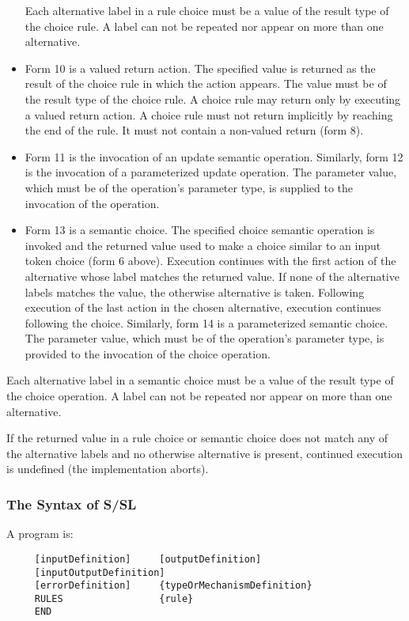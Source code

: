 \begin{itemize}
Each     alternative  label in a rule choice must be a value
of the result type of the choice rule.  A label can  not  be
repeated nor appear on more than one alternative.
\item Form 10 is a valued return action.         The specified value
is returned as the result of the choice rule  in  which  the
action appears.  The value must be of the result type of the
choice rule.  A choice rule may return only by  executing  a
valued return action.  A choice rule must not return 
implicitly by reaching the end of the rule.  It must not contain a
non-valued return (form 8).
\item Form 11 is the invocation of an update semantic 
operation.  Similarly, form 12 is the invocation of a 
parameterized  update  operation.  The parameter value, which must be
of the operation's parameter type, is supplied to the  
invocation of the operation.
\item Form 13 is  a  semantic  choice.  The specified choice
semantic operation is invoked and the returned value used to
make  a  choice  similar  to an input token choice (form 6
above).  Execution continues with the first  action  of  the
alternative whose label matches the returned value.  If none
of the alternative labels matches the value,  the  otherwise
alternative  is  taken.   Following  execution  of  the last
action in the chosen alternative, execution  continues  
following       the  choice.  Similarly, form 14 is a parameterized
semantic choice.  The parameter value, which must be of  the
operation's parameter type, is provided to the invocation of
the choice operation.
\end{itemize}

Each alternative label in a semantic     choice  must  be  a
value  of  the result type of the choice operation.  A label
can not be repeated nor appear on more than one alternative.

If the returned value in a rule choice or semantic choice
does not match any of the alternative labels and  no  
otherwise  alternative  is  present, continued execution is 
undefined (the implementation aborts).




\subsubsection{The Syntax of S/SL}

A program is:
\begin{tscreen}
\begin{verbatim}
     [inputDefinition]     [outputDefinition]
     [inputOutputDefinition]
     [errorDefinition]     {typeOrMechanismDefinition}
     RULES                 {rule}                  
     END
\end{verbatim}
\end{tscreen}



